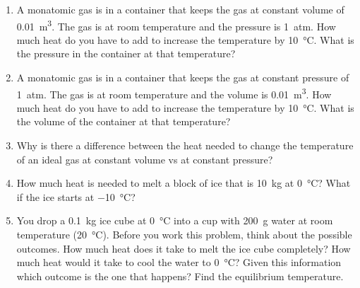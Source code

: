 \begin{enumerate}
\item
A monatomic gas is in a container that keeps the gas at constant volume of \SI{0.01}{m^3}. The gas is at room temperature and the pressure is \SI{1}{atm}. How much heat do you have to add to increase the temperature by \SI{10}{\celsius}. What is the pressure in the container at that temperature?

\item
A monatomic gas is in a container that keeps the gas at constant pressure of \SI{1}{atm}. The gas is at room temperature and the volume is \SI{0.01}{m^3}. How much heat do you have to add to increase the temperature by \SI{10}{\celsius}. What is the volume of the container at that temperature? 

\item
Why is there a difference between the heat needed to change the temperature of an ideal gas at constant volume vs at constant pressure?

\item
How much heat is needed to melt a block of ice that is \SI{10}{kg} at \SI{0}{\celsius}? What if the ice starts at \SI{-10}{\celsius}?

\item
You drop a \SI{0.1}{kg} ice cube at \SI{0}{\celsius} into a cup with \SI{200}{\gram} water at room temperature (\SI{20}{\celsius}). Before you work this problem, think about the possible outcomes. How much heat does it take to melt the ice cube completely? How much heat would it take to cool the water to \SI{0}{\celsius}? Given this information which outcome is the one that happens? Find the equilibrium temperature.  


\end{enumerate}
